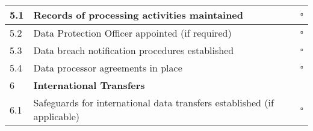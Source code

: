 \begin{tcolorbox}[title=GDPR Compliance Checklist for Digital Health Applications]
\begin{tabular}{|p{1cm}|p{12cm}|p{1cm}|}
\hline
5.1 & Records of processing activities maintained & $\square$ \\
\hline
5.2 & Data Protection Officer appointed (if required) & $\square$ \\
\hline
5.3 & Data breach notification procedures established & $\square$ \\
\hline
5.4 & Data processor agreements in place & $\square$ \\
\hline
6 & \textbf{International Transfers} & \\
\hline
6.1 & Safeguards for international data transfers established (if applicable) & $\square$ \\
\hline
\end{tabular}
\end{tcolorbox}